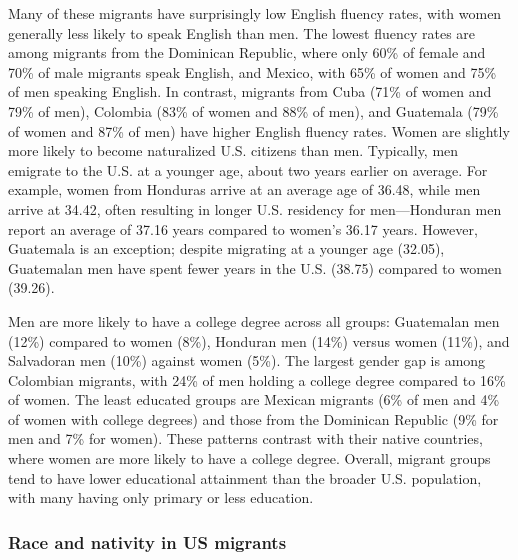 \documentclass[
]{article}
\begin{document}
Many of these migrants have surprisingly low English fluency rates, with
women generally less likely to speak English than men. The lowest
fluency rates are among migrants from the Dominican Republic, where only
60\% of female and 70\% of male migrants speak English, and Mexico, with
65\% of women and 75\% of men speaking English. In contrast, migrants
from Cuba (71\% of women and 79\% of men), Colombia (83\% of women and
88\% of men), and Guatemala (79\% of women and 87\% of men) have higher
English fluency rates. Women are slightly more likely to become
naturalized U.S. citizens than men. Typically, men emigrate to the U.S.
at a younger age, about two years earlier on average. For example, women
from Honduras arrive at an average age of 36.48, while men arrive at
34.42, often resulting in longer U.S. residency for men---Honduran men
report an average of 37.16 years compared to women's 36.17 years.
However, Guatemala is an exception; despite migrating at a younger age
(32.05), Guatemalan men have spent fewer years in the U.S. (38.75)
compared to women (39.26).

Men are more likely to have a college degree across all groups:
Guatemalan men (12\%) compared to women (8\%), Honduran men (14\%)
versus women (11\%), and Salvadoran men (10\%) against women (5\%). The
largest gender gap is among Colombian migrants, with 24\% of men holding
a college degree compared to 16\% of women. The least educated groups
are Mexican migrants (6\% of men and 4\% of women with college degrees)
and those from the Dominican Republic (9\% for men and 7\% for women).
These patterns contrast with their native countries, where women are
more likely to have a college degree. Overall, migrant groups tend to
have lower educational attainment than the broader U.S. population, with
many having only primary or less education.

\subsubsection{Race and nativity in US
migrants}\label{race-and-nativity-in-us-migrants}
\end{document}
